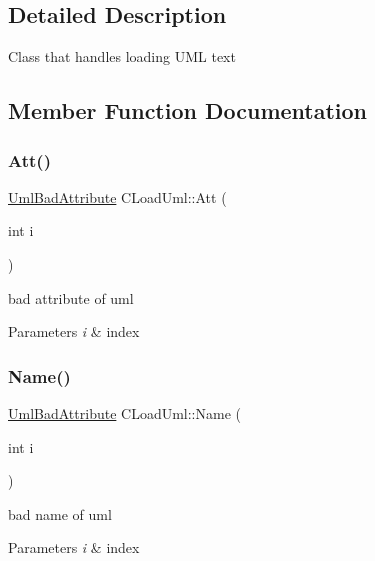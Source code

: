 \subsection{Detailed Description}
Class that handles loading U\+ML text 

\subsection{Member Function Documentation}
\mbox{\label{class_c_load_uml_ac006b1deb2a0ae1626462c0bfdfc56bf}} 
\subsubsection{\texorpdfstring{Att()}{Att()}}
{\footnotesize\ttfamily \mbox{\hyperlink{class_uml_bad_attribute}{Uml\+Bad\+Attribute}} C\+Load\+Uml\+::\+Att (\begin{DoxyParamCaption}\item[{int}]{i }\end{DoxyParamCaption})}

bad attribute of uml 
\begin{DoxyParams}{Parameters}
{\em i} & index \\
\hline
\end{DoxyParams}
\mbox{\label{class_c_load_uml_a8219fa45bf4cf94d454439f9a9f672f7}} 
\subsubsection{\texorpdfstring{Name()}{Name()}}
{\footnotesize\ttfamily \mbox{\hyperlink{class_uml_bad_attribute}{Uml\+Bad\+Attribute}} C\+Load\+Uml\+::\+Name (\begin{DoxyParamCaption}\item[{int}]{i }\end{DoxyParamCaption})}

bad name of uml 
\begin{DoxyParams}{Parameters}
{\em i} & index \\
\hline
\end{DoxyParams}
\mbox{\label{class_c_load_uml_a2350b0f38d9859b6bc26c3df774fcd3a}} 
